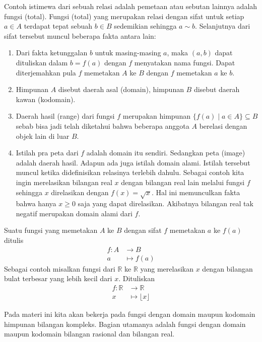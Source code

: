 \documentclass{article}
\begin{document}
Contoh istimewa dari sebuah relasi adalah pemetaan atau sebutan lainnya adalah fungsi (total). Fungsi (total) yang merupakan relasi dengan sifat untuk setiap $a \in A$ terdapat tepat sebuah $b \in B$ sedemikian sehingga $a \sim b$. Selanjutnya dari sifat tersebut muncul beberapa fakta antara lain:
\begin{enumerate}
\item Dari fakta ketunggalan $b$ untuk masing-masing $a$, maka $(a,b)$ dapat dituliskan dalam $b = f(a)$ dengan $f$ menyatakan nama fungsi. Dapat diterjemahkan pula $f$ memetakan $A$ ke $B$ dengan $f$ memetakan $a$ ke $b$.
\item Himpunan $A$ disebut daerah asal (domain), himpunan $B$ disebut daerah kawan (kodomain).
\item Daerah hasil (range) dari fungsi $f$ merupakan himpunan $\{f(a) \mid a \in A\} \subseteq B$ sebab bisa jadi telah diketahui bahwa beberapa anggota $A$ berelasi dengan objek lain di luar $B$.
\item Istilah pra peta dari $f$ adalah domain itu sendiri. Sedangkan peta (image) adalah daerah hasil. Adapun ada juga istilah domain alami. Istilah tersebut muncul ketika didefinisikan relasinya terlebih dahulu. Sebagai contoh kita ingin merelasikan bilangan real $x$ dengan bilangan real lain melalui fungsi $f$ sehingga $x$ direlasikan dengan $f(x) = \sqrt{x}$. Hal ini memunculkan fakta bahwa hanya $x \ge 0$ saja yang dapat direlasikan. Akibatnya bilangan real tak negatif merupakan domain alami dari $f$.
\end{enumerate}

Suatu fungsi yang memetakan $A$ ke $B$ dengan sifat $f$ memetakan $a$ ke $f(a)$ ditulis
\begin{align*}
f : A &\rightarrow B \\
a &\mapsto f(a)
\end{align*}
Sebagai contoh misalkan fungsi dari $\mathbb{R}$ ke $\mathbb{R}$ yang merelasikan $x$ dengan bilangan bulat terbesar yang lebih kecil dari $x$. Dituliskan
\begin{align*}
f : \mathbb{R} &\rightarrow \mathbb{R} \\
x &\mapsto \lfloor x \rfloor
\end{align*}

Pada materi ini kita akan bekerja pada fungsi dengan domain maupun kodomain himpunan bilangan kompleks. Bagian utamanya adalah fungsi dengan domain maupun kodomain bilangan rasional dan bilangan real.
\end{document}
